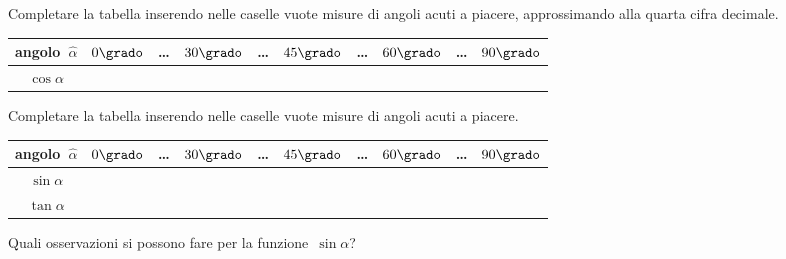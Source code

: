 \begin{esercizio}
\label{ese:G.3}
Completare la tabella inserendo nelle caselle vuote misure di angoli acuti a 
piacere, approssimando alla quarta cifra decimale.
\begin{center}
\begin{tabular}{cccccccccc}
\toprule
angolo~$\hat{\alpha}$ & $0\grado$ & \ldots & $30\grado$ & \ldots & $45\grado$ & 
\ldots & $60\grado$ & \ldots & $90\grado$\\
\midrule
$\cos \alpha$ & & & & & & & & & \\
\bottomrule
\end{tabular}
\end{center}
\end{esercizio}

\begin{esercizio}
\label{ese:G.4}
Completare la tabella inserendo nelle caselle vuote misure di angoli acuti a 
piacere.
\begin{center}
\begin{tabular}{cccccccccc}
\toprule
angolo~$\hat{\alpha}$ & $0\grado$ & \ldots & $30\grado$ & \ldots & $45\grado$ & 
\ldots & $60\grado$ & \ldots & $90\grado$\\
\midrule
$\sin \alpha$ & & & & &  &  &  &  &  \\
$\tan \alpha$ & & &  &  &  &  &  &  &  \\
\bottomrule
\end{tabular}
\end{center}

Quali osservazioni si possono fare per la funzione~$\sin \alpha$?
\end{esercizio}

